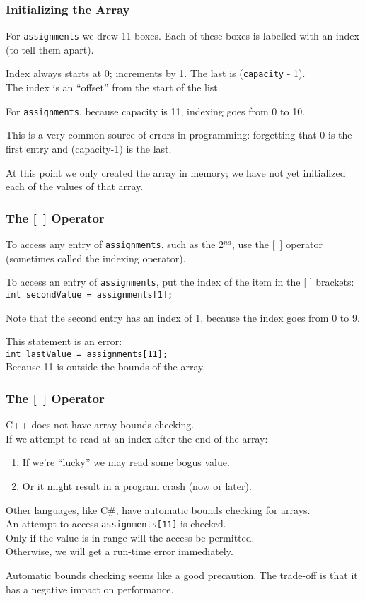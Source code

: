 \begin{frame}
\frametitle{Initializing the Array}

For \texttt{assignments} we drew 11 boxes. Each of these boxes is labelled with an index (to tell them apart).

Index always starts at 0; increments by 1. The last is (\texttt{capacity} - 1).\\
\quad The index is an ``offset'' from the start of the list.

For \texttt{assignments}, because capacity is 11, indexing goes from 0 to 10.

This is a very common source of errors in programming: forgetting that 0 is the first entry and (capacity-1) is the last.

At this point we only created the array in memory; we have not yet initialized each of the values of that array.

\end{frame}

\begin{frame}
\frametitle{The [~] Operator}

To access any entry of \texttt{assignments}, such as the  2$^{nd}$, use the [~] operator (sometimes called the \alert{indexing operator}).

To access an entry of \texttt{assignments}, put the index of the item in the [ ] brackets: \texttt{int secondValue = assignments[1];}

Note that the second entry has an index of 1, because the index goes from 0 to 9.

This statement is an error:\\
\texttt{int lastValue = assignments[11];}\\
\quad Because 11 is outside the bounds of the array.

\end{frame}

\begin{frame}
\frametitle{The [~] Operator}

C++ does not have array bounds checking.\\
\quad If we attempt to read at an index after the end of the array:\\
\begin{enumerate}
	\item If we're ``lucky'' we may read some bogus value.\\
	\item Or it might result in a program crash (now or later).
\end{enumerate}

Other languages, like C\#, have automatic bounds checking for arrays.\\
\quad An attempt to access \texttt{assignments[11]} is checked.\\
\quad Only if the value is in range will the access be permitted.\\
\quad Otherwise, we will get a run-time error immediately.


Automatic bounds checking seems like a good precaution. The trade-off is that it has a negative impact on performance.

\end{frame}


